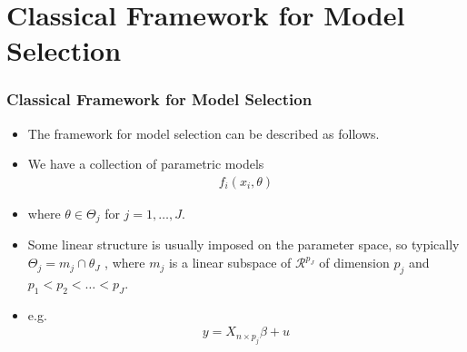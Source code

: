 \documentclass[
  shownotes,
  xcolor={svgnames},
  hyperref={colorlinks,citecolor=DarkBlue,linkcolor=DarkRed,urlcolor=DarkBlue}
  ]{beamer}
\begin{document}
\section{Classical Framework for Model Selection}
\begin{frame}[fragile]
\frametitle{Classical Framework for Model Selection }

\begin{itemize}
\item The framework for model selection can be described as follows. 

\item We have a collection of parametric models
\begin{align}
{f_i(x_i,\theta)}
\end{align}

\item where $\theta \in \Theta_j$ for $j = 1,\dots, J$.

 \item Some linear structure is usually imposed on the parameter space, so typically $\Theta_j=m_j\cap\theta_J$ , where $m_j$ is a linear subspace of $\mathcal{R}^{p_J}$ of dimension $p_j$ and $p_1 < p_2 < \dots < p_J$. 
\item e.g.
\begin{align}
y=X_{n\times p_j}\beta+u
\end{align}
\end{itemize}

\end{frame}
\end{document}
